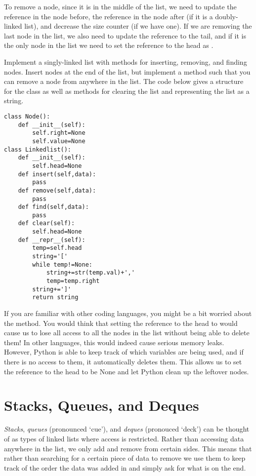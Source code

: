 To remove a node, since it is in the middle of the list, we need to update the reference in the node before, the reference in the node after (if it is a doubly-linked list), and decrease the size counter (if we have one).
If we are removing the last node in the list, we also need to update the reference to the tail, and if it is the only node in the list we need to set the reference to the head as .


\begin{problem}
Implement a singly-linked list with methods for inserting, removing, and finding nodes. Insert nodes at the end of the list, but implement a method such that you can remove a node from anywhere in the list. The code below gives a structure for the class as well as methods for clearing the list and representing the list as a string.
\begin{lstlisting}
class Node():
    def __init__(self):
        self.right=None
        self.value=None
class Linkedlist():
    def __init__(self):
        self.head=None
    def insert(self,data):
        pass
    def remove(self,data):
        pass
    def find(self,data):
        pass
    def clear(self):
        self.head=None
    def __repr__(self):
        temp=self.head
        string='['
        while temp!=None:
            string+=str(temp.val)+','
            temp=temp.right
        string+=']'
        return string
\end{lstlisting}
\label{prob:LinkedLists}
\end{problem}

If you are familiar with other coding languages, you might be a bit worried about the  method.
You would think that setting the reference to the head to  would cause us to lose all access to all the nodes in the list without being able to delete them!
In other languages, this would indeed cause serious memory leaks.
However, Python is able to keep track of which variables are being used, and if there is no access to them, it automatically deletes them.
This allows us to set the reference to the head to be None and let Python clean up the leftover nodes.

\section*{Stacks, Queues, and Deques}
\emph{Stacks}, \emph{queues} (pronounced `cue'), and \emph{deques} (pronouced `deck') can be thought of as types of linked lists where access is restricted. Rather than accessing data anywhere in the list, we only add and remove from certain sides.
This means that rather than searching for a certain piece of data to remove we use them to keep track of the order the data was added in and simply ask for what is on the end.

